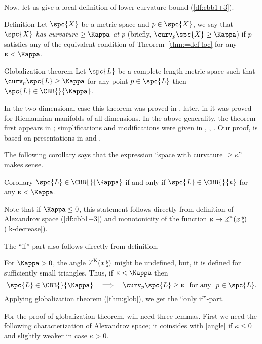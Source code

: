 Now, let us give a local definition of lower curvature bound (\ref{df:cbb1+3}).

\begin{thm}{Definition}
Let $\spc{X}$ be a metric space and $p\in \spc{X}$, 
we say that \emph{$\spc{X}$ has curvature $\ge\Kappa$ at $p$} 
(briefly, $\curv_p \spc{X}\ge\Kappa$) 
if $p$ satisfies any of the equivalent condition of Theorem~\ref{thm:=def-loc} for any $\kappa<\Kappa$.
\end{thm}



\begin{thm}{Globalization theorem}\label{thm:glob} 
Let $\spc{L}$ be a complete length metric space such that $\curv_p \spc{L}\ge\Kappa$ for any point $p\in \spc{L}$ then $\spc{L}\in\CBB{}{\Kappa}$.
\end{thm}

In the two-dimensional case this theorem was proved in \cite{alexandrov:devel}, later, in \cite{toponogov-globalization+splitting} it was proved for Riemannian manifolds of all dimensions.
In the above generality, the theorem first appears in \cite{BGP}; simplifications and modifications were given in \cite{plaut:dimension}, \cite{shiohama}, \cite{BBI}.
Our proof, is based on presentations in  \cite{plaut:dimension} and \cite{BBI}.

The following corollary says that the expression ``space with curvature $\ge \kappa$'' makes sense.

\begin{thm}{Corollary}\label{cor:CAT>k-sence}
$\spc{L}\in\CBB{}{\Kappa}$ if and only if $\spc{L}\in\CBB{}{\kappa}$ for any $\kappa<\Kappa$.
\end{thm}

Note that if $\Kappa\le 0$, this statement follows directly from definition of Alexandrov space (\ref{df:cbb1+3}) and monotonicity of the function $\kappa\mapsto\angk\kappa x y z$ (\ref{k-decrease}).

The ``if''-part also follows directly from definition.

For $\Kappa>0$, the angle $\angk{\Kappa} x y z$ might be undefined, but, it is defined for sufficiently small triangles.
Thus, if $\kappa<\Kappa$ then
\[\spc{L}\in\CBB{}{\Kappa}\ \ \ \Longrightarrow\ \ \ \curv_p \spc{L}\ge\kappa\ \ \text{for any}\ \ p\in \spc{L}.\]
Applying  globalization theorem (\ref{thm:glob}), we get the ``only if''-part.
\qeds

For the proof of globalization theorem,
will need three lemmas.
First we need the following characterization of Alexandrov space; 
it coinsides with \ref{angle} if $\kappa\le 0$ and slightly weaker in case $\kappa>0$.


